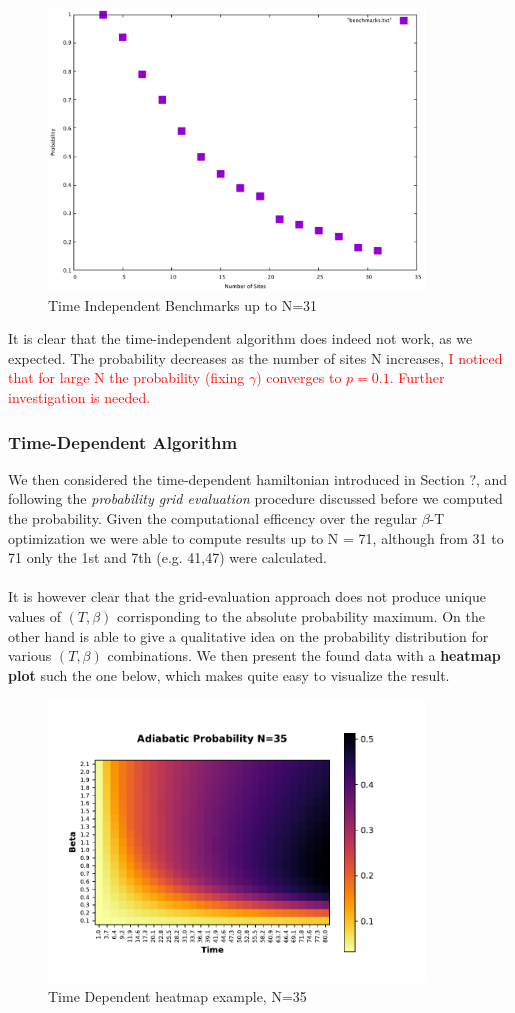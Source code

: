\documentclass[aps,pra,reprint, onecolumn]{revtex4-2}
\newcommand{\red}[1]{\textcolor{red}{#1}}
\begin{document}
\begin{figure}[ht]
\includegraphics[width=10cm]{./figures/benchmarks.pdf}
\caption{Time Independent Benchmarks up to N=31}
\end{figure}

It is clear that the time-independent algorithm does indeed not work, as we expected. The probability decreases as the number of sites N increases, \red{I noticed that for large N the probability (fixing $\gamma$) converges to $p=0.1$. Further investigation is needed.}

\subsubsection{\textbf{Time-Dependent Algorithm}}
We then considered the time-dependent hamiltonian introduced in Section ?, and following the \textit{probability grid evaluation} procedure discussed before we computed the probability. Given the computational efficency over the regular $\beta$-T optimization we were able to compute results up to N = 71, although from 31 to 71 only the 1st and 7th (e.g. 41,47) were calculated. \\ \\
It is however clear that the grid-evaluation approach does not produce unique values of $(T,\beta)$ corrisponding to the absolute probability maximum. On the other hand is able to give a qualitative idea on the probability distribution for various $(T,\beta)$ combinations. We then present the found data with a \textbf{heatmap plot} such the one below, which makes quite easy to visualize the result.
\begin{figure}[ht]
\includegraphics[width=10cm]{./figures/example.pdf}%
\caption{Time Dependent heatmap example, N=35}
\end{figure}
\end{document}
